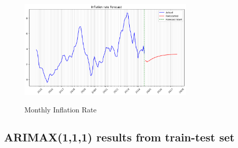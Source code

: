 \documentclass[11pt]{article}
\begin{document}
    \begin{figure}[H]
        \caption*{Monthly Inflation Rate}
        \centering
        \includegraphics[width=0.75\textwidth]{inflation_plot.png}
        \label{inflation_plot}
    \end{figure}


\subsection{ARIMAX(1,1,1) results from train-test set}
\label{test_pred_table}
\end{document}
